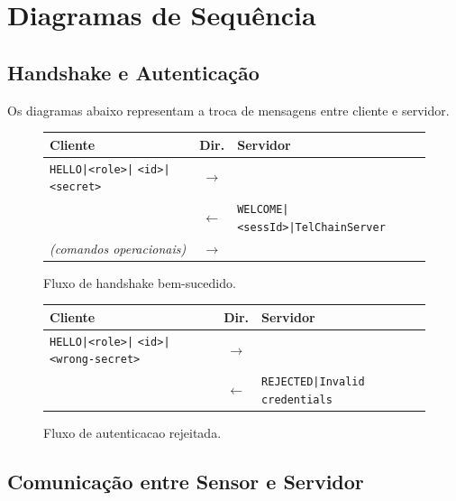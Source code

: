 \documentclass[12pt, a4paper]{article}
\begin{document}
\section{Diagramas de Sequência}

\subsection{Handshake e Autenticação}

Os diagramas abaixo representam a troca de mensagens entre cliente e servidor.

\begin{figure}[H]
\centering
\begin{tabular}{p{4cm} c p{6.5cm}}
\toprule
\textbf{Cliente} & \textbf{Dir.} & \textbf{Servidor} \\
\midrule
\texttt{HELLO|<role>|} \newline \texttt{<id>|<secret>} & $\longrightarrow$ & \\
 & $\longleftarrow$ & \texttt{WELCOME|<sessId>|TelChainServer} \\
\textit{(comandos operacionais)} & $\longrightarrow$ & \\
\bottomrule
\end{tabular}
\caption{Fluxo de handshake bem-sucedido.}
\label{fig:seq-auth}
\end{figure}

\begin{figure}[H]
\centering
\begin{tabular}{p{5cm} c p{5.5cm}}
\toprule
\textbf{Cliente} & \textbf{Dir.} & \textbf{Servidor} \\
\midrule
\texttt{HELLO|<role>|} \newline \texttt{<id>|<wrong-secret>} & $\longrightarrow$ & \\
 & $\longleftarrow$ & \texttt{REJECTED|Invalid credentials} \\
\bottomrule
\end{tabular}
\caption{Fluxo de autenticacao rejeitada.}
\label{fig:seq-reject}
\end{figure}

\subsection{Comunicação entre Sensor e Servidor}
\end{document}
